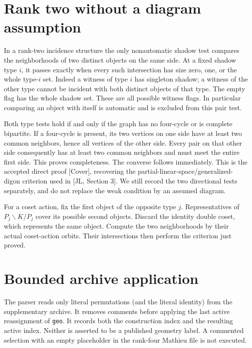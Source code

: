 \documentclass[11pt]{article}
\begin{document}
\section{Rank two without a diagram assumption}
In a rank-two incidence structure the only nonautomatic shadow test
compares the neighborhoods of two distinct objects on the same side.
At a fixed shadow type $i$, it passes exactly when every such intersection
has size zero, one, or the whole type-$i$ set. Indeed a witness of type
$i$ has singleton shadow; a witness of the other type cannot be incident
with both distinct objects of that type. The empty flag has the whole
shadow set. These are all possible witness flags. In particular comparing
an object with itself is automatic and is excluded from this pair test.

Both type tests hold if and only if the graph has no four-cycle or is
complete bipartite. If a four-cycle is present, its two vertices on one
side have at least two common neighbors, hence all vertices of the other
side. Every pair on that other side consequently has at least two common
neighbors and must meet the entire first side. This proves completeness.
The converse follows immediately. This is the accepted direct proof
[Cover], recovering the partial-linear-space/generalized-digon criterion
used in [JL, Section 3]. We still record the two directional tests
separately, and do not replace the weak condition by an assumed diagram.

For a coset action, fix the first object of the opposite type $j$.
Representatives of $P_j\backslash K/P_j$ cover its possible second
objects. Discard the identity double coset, which represents the same
object. Compute the two neighborhoods by their actual coset-action
orbits. Their intersections then perform the criterion just proved.

\section{Bounded archive application}
The parser reads only literal permutations (and the literal identity)
from the supplementary archive. It removes comments before applying the
last active reassignment of \texttt{geo}. It records both the construction
index and the resulting active index. Neither is asserted to be a
published geometry label. A commented selection with an empty placeholder
in the rank-four Mathieu file is not executed.
\end{document}
